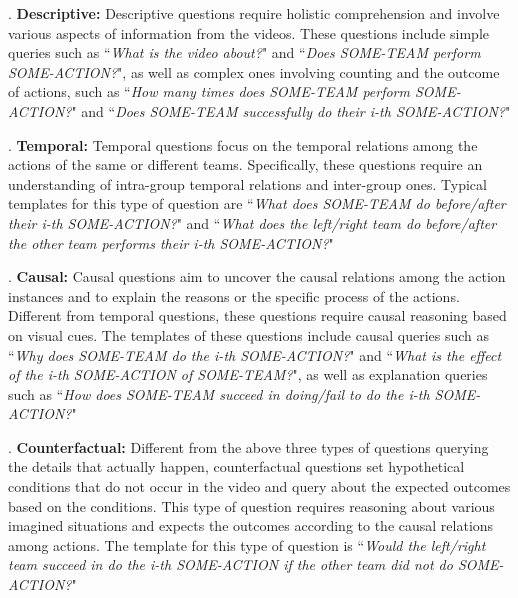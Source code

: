 {. \textbf{Descriptive:} Descriptive questions require holistic comprehension and involve various aspects of information from the videos. These questions include simple queries such as ``\textit{What is the video about?}" and ``\textit{Does SOME-TEAM perform SOME-ACTION?}", as well as complex ones involving counting and the outcome of actions, such as ``\textit{How many times does SOME-TEAM perform SOME-ACTION?}" and ``\textit{Does SOME-TEAM successfully do their i-th SOME-ACTION?}"

. \textbf{Temporal:} Temporal questions focus on the temporal relations among the actions of the same or different teams. Specifically, these questions require an understanding of intra-group temporal relations and inter-group ones. Typical templates for this type of question are ``\textit{What does SOME-TEAM do before/after their i-th SOME-ACTION?}" and ``\textit{What does the left/right team do before/after the other team performs their i-th SOME-ACTION?}"

. \textbf{Causal:} Causal questions aim to uncover the causal relations among the action instances and to explain the reasons or the specific process of the actions. Different from temporal questions, these questions require causal reasoning based on visual cues. The templates of these questions include causal queries such as ``\textit{Why does SOME-TEAM do the i-th SOME-ACTION?}" and ``\textit{What is the effect of the i-th SOME-ACTION of SOME-TEAM?}", as well as explanation queries such as ``\textit{How does SOME-TEAM succeed in doing/fail to do the i-th SOME-ACTION?}"

. \textbf{Counterfactual:} Different from the above three types of questions querying the details that actually happen, counterfactual questions set hypothetical conditions that do not occur in the video and query about the expected outcomes based on the conditions. This type of question requires reasoning about various imagined situations and expects the outcomes according to the causal relations among actions. The template for this type of question is ``\textit{Would the left/right team succeed in do the i-th SOME-ACTION if the other team did not do SOME-ACTION?}"


}
